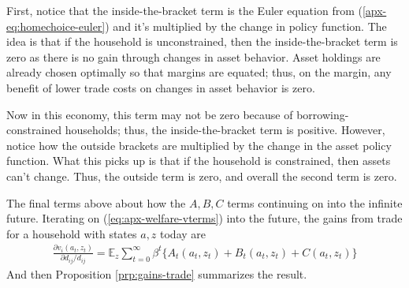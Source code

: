 \documentclass[12pt,pdftex]{article}
\begin{document}
\begin{onehalfspacing}
\begin{itemize}
    First, notice that the inside-the-bracket term is the Euler equation from (\ref{apx-eq:homechoice-euler}) and it's multiplied by the change in policy function. The idea is that if the household is unconstrained, then the inside-the-bracket term is zero as there is no gain through changes in asset behavior. Asset holdings are already chosen optimally so that margins are equated; thus, on the margin, any benefit of lower trade costs on changes in asset behavior is zero.

    Now in this economy, this term may not be zero because of borrowing-constrained households; thus, the inside-the-bracket term is positive. However, notice how the outside brackets are multiplied by the change in the asset policy function. What this picks up is that if the household is constrained, then assets can't change. Thus, the outside term is zero, and overall the second term is zero.
\end{itemize}
The final terms above about how the $A, B, C$ terms continuing on into the infinite future. Iterating on (\ref{eq:apx-welfare-vterms}) into the future, the gains from trade for a household with states $a,z$ today are
\begin{align}
\frac{\partial v_i(a_{t}, z_{t})}{\partial d_{ij} / d_{ij}} = \mathbb{E}_{z} \sum_{t = 0}^{\infty} \beta^{t} \bigg \{ A_{t}(a_{t},z_{t}) + B_{t}(a_{t},z_{t}) + C(a_{t},z_{t}) \bigg \}
\label{eq:apx-welfare-v}
\end{align}
And then Proposition \ref{prp:gains-trade} summarizes the result.



\end{onehalfspacing}
\end{document}
